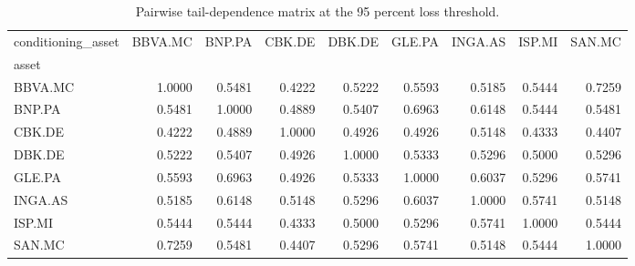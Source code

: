\begin{table}
\caption{Pairwise tail-dependence matrix at the 95 percent loss threshold.}
\label{tab:tail_dependence_matrix_q95}
\begin{tabular}{lrrrrrrrr}
\toprule
conditioning_asset & BBVA.MC & BNP.PA & CBK.DE & DBK.DE & GLE.PA & INGA.AS & ISP.MI & SAN.MC \\
asset &  &  &  &  &  &  &  &  \\
\midrule
BBVA.MC & 1.0000 & 0.5481 & 0.4222 & 0.5222 & 0.5593 & 0.5185 & 0.5444 & 0.7259 \\
BNP.PA & 0.5481 & 1.0000 & 0.4889 & 0.5407 & 0.6963 & 0.6148 & 0.5444 & 0.5481 \\
CBK.DE & 0.4222 & 0.4889 & 1.0000 & 0.4926 & 0.4926 & 0.5148 & 0.4333 & 0.4407 \\
DBK.DE & 0.5222 & 0.5407 & 0.4926 & 1.0000 & 0.5333 & 0.5296 & 0.5000 & 0.5296 \\
GLE.PA & 0.5593 & 0.6963 & 0.4926 & 0.5333 & 1.0000 & 0.6037 & 0.5296 & 0.5741 \\
INGA.AS & 0.5185 & 0.6148 & 0.5148 & 0.5296 & 0.6037 & 1.0000 & 0.5741 & 0.5148 \\
ISP.MI & 0.5444 & 0.5444 & 0.4333 & 0.5000 & 0.5296 & 0.5741 & 1.0000 & 0.5444 \\
SAN.MC & 0.7259 & 0.5481 & 0.4407 & 0.5296 & 0.5741 & 0.5148 & 0.5444 & 1.0000 \\
\bottomrule
\end{tabular}
\end{table}

